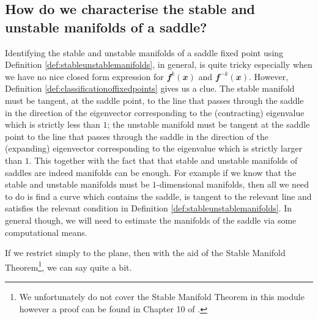 \documentclass[
  a4paper,
  oneside,
  final]{krantz}
\renewcommand{\v}[1]{{\mathbfit{#1}}}
\theoremstyle{definition}
\theoremstyle{definition}
\theoremstyle{definition}
\theoremstyle{definition}
\theoremstyle{remark}
\begin{document}
\hypertarget{how-do-we-characterise-the-stable-and-unstable-manifolds-of-a-saddle}{%
\subsection{How do we characterise the stable and unstable manifolds of a saddle?}\label{how-do-we-characterise-the-stable-and-unstable-manifolds-of-a-saddle}}

Identifying the stable and unstable manifolds of a saddle fixed point using Definition \ref{def:stableunstablemanifolds}, in general, is quite tricky especially when we have no nice closed form expression for \(\v{f}^{k}(\v{x})\) and \(\v{f}^{-k}(\v{x})\). However, Definition \ref{def:classificationoffixedpoints} gives us a clue. The stable manifold must be tangent, at the saddle point, to the line that passes through the saddle in the direction of the eigenvector corresponding to the (contracting) eigenvalue which is strictly less than \(1\); the unstable manifold must be tangent at the saddle point to the line that passes through the saddle in the direction of the (expanding) eigenvector corresponding to the eigenvalue which is strictly larger than \(1\). This together with the fact that that stable and unstable manifolds of saddles are indeed manifolds can be enough. For example if we know that the stable and unstable manifolds must be \(1\)-dimensional manifolds, then all we need to do is find a curve which contains the saddle, is tangent to the relevant line and satisfies the relevant condition in Definition \ref{def:stableunstablemanifolds}. In general though, we will need to estimate the manifolds of the saddle via some computational means.

If we restrict simply to the plane, then with the aid of the Stable Manifold Theorem\footnote{We unfortunately do not cover the Stable Manifold Theorem in this module however a proof can be found in Chapter 10 of \citep{ASY}.}, we can say quite a bit.
\end{document}
